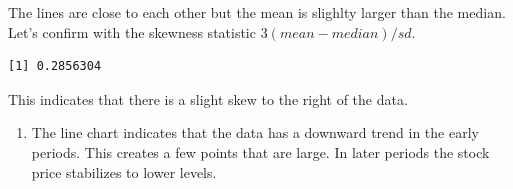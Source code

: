 \documentclass[
  letterpaper,
  DIV=11,
  numbers=noendperiod]{scrreprt}
\newenvironment{Shaded}{\begin{snugshade}}{\end{snugshade}}
\newcommand{\AttributeTok}[1]{\textcolor[rgb]{0.40,0.45,0.13}{#1}}
\newcommand{\ConstantTok}[1]{\textcolor[rgb]{0.56,0.35,0.01}{#1}}
\newcommand{\DecValTok}[1]{\textcolor[rgb]{0.68,0.00,0.00}{#1}}
\newcommand{\FunctionTok}[1]{\textcolor[rgb]{0.28,0.35,0.67}{#1}}
\newcommand{\NormalTok}[1]{\textcolor[rgb]{0.00,0.23,0.31}{#1}}
\newcommand{\OtherTok}[1]{\textcolor[rgb]{0.00,0.23,0.31}{#1}}
\newcommand{\SpecialCharTok}[1]{\textcolor[rgb]{0.37,0.37,0.37}{#1}}
\newcommand{\StringTok}[1]{\textcolor[rgb]{0.13,0.47,0.30}{#1}}
\providecommand{\tightlist}{%
  \setlength{\itemsep}{0pt}\setlength{\parskip}{0pt}}\usepackage{longtable,booktabs,array}
\begin{document}
The lines are close to each other but the mean is slighlty larger than
the median. Let's confirm with the skewness statistic
\(3(mean-median)/sd\).

\begin{Shaded}
\end{Shaded}

\begin{verbatim}
[1] 0.2856304
\end{verbatim}

This indicates that there is a slight skew to the right of the data.

\begin{blackbox}

\begin{enumerate}
\def\labelenumi{\arabic{enumi}.}
\setcounter{enumi}{2}
\tightlist
\item
  The line chart indicates that the data has a downward trend in the
  early periods. This creates a few points that are large. In later
  periods the stock price stabilizes to lower levels.
\end{enumerate}

\end{blackbox}

\begin{Shaded}
\end{Shaded}
\end{document}
